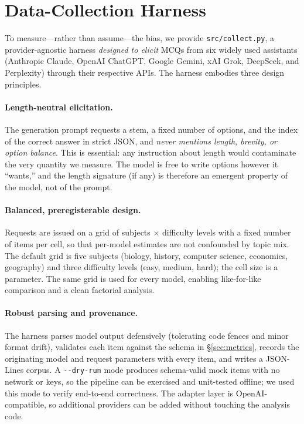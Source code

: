 \documentclass[10pt,twocolumn]{article}
\begin{document}
\section{Data-Collection Harness}
\label{sec:harness}

To measure---rather than assume---the bias, we provide
\texttt{src/collect.py}, a provider-agnostic harness \emph{designed to elicit}
MCQs from six widely used assistants (Anthropic Claude, OpenAI ChatGPT, Google
Gemini,
xAI Grok, DeepSeek, and Perplexity) through their respective APIs. The harness
embodies three design principles.

\paragraph{Length-neutral elicitation.} The generation prompt requests a stem,
a fixed number of options, and the index of the correct answer in strict JSON,
and \emph{never mentions length, brevity, or option balance}. This is
essential: any instruction about length would contaminate the very quantity we
measure. The model is free to write options however it ``wants,'' and the
length signature (if any) is therefore an emergent property of the model, not
of the prompt.

\paragraph{Balanced, preregisterable design.} Requests are issued on a grid of
subjects $\times$ difficulty levels with a fixed number of items per cell, so
that per-model estimates are not confounded by topic mix. The default grid is
five subjects (biology, history, computer science, economics, geography) and
three difficulty levels (easy, medium, hard); the cell size is a parameter.
The same grid is used for every model, enabling like-for-like comparison and a
clean factorial analysis.

\paragraph{Robust parsing and provenance.} The harness parses model output
defensively (tolerating code fences and minor format drift), validates each
item against the schema in \S\ref{sec:metrics}, records the originating model
and request parameters with every item, and writes a JSON-Lines corpus. A
\texttt{-{}-dry-run} mode produces schema-valid mock items with no network or
keys, so the pipeline can be exercised and unit-tested offline; we used this
mode to verify end-to-end correctness. The adapter layer is OpenAI-compatible,
so additional providers can be added without touching the analysis code.
\end{document}
